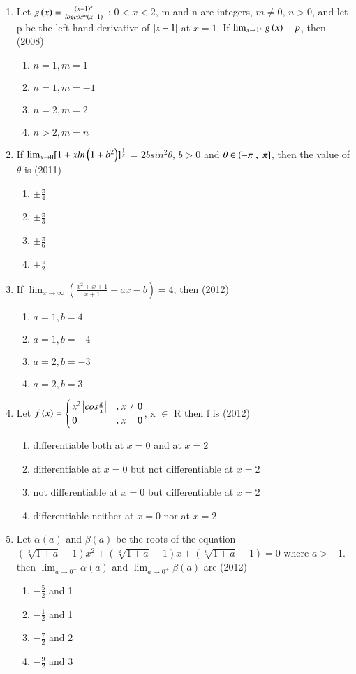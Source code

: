 \documentclass[journal]{IEEEtran}
\numberwithin{equation}{enumi}
\numberwithin{figure}{enumi}
\begin{document}
\begin{enumerate}
	\item Let $g\left(x\right)= \frac{\left(x-1\right)^n}{logcos^m\left(x-1\right)}$ ; $0<x<2$, m and n are integers, $m\neq0$, $n>0$, and let p be the left hand derivative of $\left\vert x-1\right\vert$ at $x=1$. If $\lim_{x \to 1^+}
		{g\left(x\right)=p}$, then \hfill{(2008)}
		\begin{enumerate}
			\item $n=1,m=1$
			\item $n=1,m=-1$
			\item $n=2,m=2$
			\item $n>2,m=n$ 
		\end{enumerate}
	\item If $\lim_{x \to 0}[1+xln\left(1+b^2\right)]^\frac{1}{x}$ = $2bsin^2\theta$, $b>0$ and $\theta \in \left(-\pi\right.,{}\left.\pi\right]$, then the value of $\theta$ is \hfill{(2011)}
		\begin{enumerate}
			\item $\pm\frac{\pi}{4}$
			\item $\pm\frac{\pi}{3}$
			\item $\pm\frac{\pi}{6}$
			\item $\pm\frac{\pi}{2}$ 
		\end{enumerate}
	\item If $\lim_{ x \to \infty}(\frac{x^2+x+1}{x+1}-ax-b) = 4$, then \hfill{(2012)}
		\begin{enumerate}
			\item $a=1,b=4$
			\item $a=1,b=-4$
			\item $a=2,b=-3$
			\item $a=2,b=3$ 
		\end{enumerate}
	\item Let $f\left(x\right) =\begin{cases} x^2\left\vert cos \frac{\pi}{x}\right\vert & \text{, } x \neq 0 \\ 0 & \text{, } x = 0 \end{cases}$, x $\in$ R then f is \hfill{(2012)}
		\begin{enumerate}
			\item differentiable both at $x=0$ and at $x=2$
			\item differentiable at $x=0$ but not differentiable at $x=2$
			\item not differentiable at $x=0$ but differentiable at $x=2$
			\item differentiable neither at $x=0$ nor at $x=2$ 
		\end{enumerate}
	\item Let $\alpha(a)$ and $\beta(a)$ be the roots of the equation $(\sqrt[3]{1+a}-1)x^2+(\sqrt[2]{1+a}-1)x+(\sqrt[6]{1+a}-1)=0$ where $a>-1$. then $\lim_{a \to 0^+}{\alpha(a)}$ and $\lim_{a \to 0^+}{\beta(a)}$ are \hfill{(2012)}
		\begin{enumerate}
			\item $-\frac{5}{2}$ and 1
			\item $-\frac{1}{2}$ and 1
			\item $-\frac{7}{2}$ and 2
			\item $-\frac{9}{2}$ and 3 
		\end{enumerate}

\end{enumerate}
\end{document}
